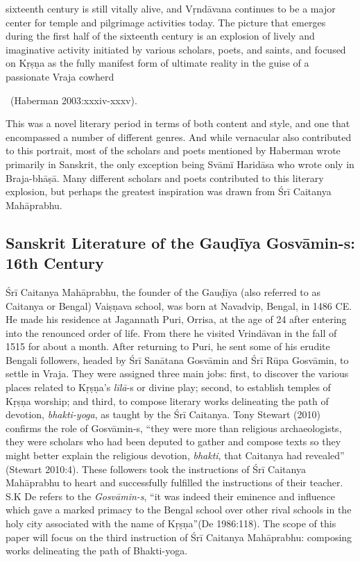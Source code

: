 \begin{myquote}
sixteenth century is still vitally alive, and Vṛndāvana continues to be a major center for temple and pilgrimage activities today. The picture that emerges during the first half of the sixteenth century is an explosion of lively and imaginative activity initiated by various scholars, poets, and saints, and focused on Kṛṣṇa as the fully manifest form of ultimate reality in the guise of a passionate Vraja cowherd 

~\hfill(Haberman 2003:xxxiv-xxxv). 
\end{myquote}

This was a novel literary period in terms of both content and style, and one that encompassed a number of different genres. And while vernacular also contributed to this portrait, most of the scholars and poets mentioned by Haberman wrote primarily in Sanskrit, the only exception being Svāmī Haridāsa who wrote only in Braja-bhāṣā. Many different scholars and poets contributed to this literary explosion, but perhaps the greatest inspiration was drawn from Śrī Caitanya Mahāprabhu. 

\subsection*{Sanskrit Literature of the Gauḍīya Gosvāmin-s: 16th Century}

Śrī Caitanya Mahāprabhu, the founder of the Gauḍīya (also referred to as Caitanya or Bengal) Vaiṣṇava school, was born at Navadvip, Bengal, in 1486 CE\@. He made his residence at Jagannath Puri, Orrisa, at the age of 24 after entering into the renounced order of life. From there he visited Vrindāvan in the fall of 1515 for about a month. After returning to Puri, he sent some of his erudite Bengali followers, headed by Śrī Sanātana Gosvāmin and Śrī Rūpa Gosvāmin, to settle in Vraja. They were assigned three main jobs: first, to discover the various places related to Kṛṣṇa’s {\sl līlā}-s or divine play; second, to establish temples of Kṛṣṇa worship; and third, to compose literary works delineating the path of devotion, {\sl bhakti-yoga}, as taught by the Śrī Caitanya. Tony Stewart (2010) confirms the role of Gosvāmin-s, “they were more than religious archaeologists, they were scholars who had been deputed to gather and compose texts so they might better explain the religious devotion, {\sl bhakti}, that Caitanya had revealed” (Stewart 2010:4). These followers took the instructions of Śrī Caitanya Mahāprabhu to heart and successfully fulfilled the instructions of their teacher. S.K De refers to the {\sl Gosvāmin-s}, “it was indeed their eminence and influence which gave a marked primacy to the Bengal school over other rival schools in the holy city associated with the name of Kṛṣṇa”(De 1986:118). The scope of this paper will focus on the third instruction of Śrī Caitanya Mahāprabhu: composing works delineating the path of Bhakti-yoga. 

